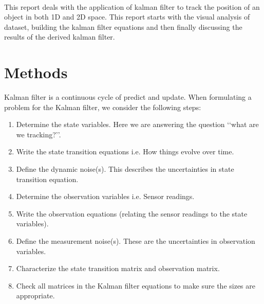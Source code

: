 \documentclass[12pt]{article}
\begin{document}
\\
This report deals with the application of kalman filter to track the position of an object in both 1D and 2D space. This report starts with the visual analysis of dataset, building the kalman filter equations and then finally discussing the results of the derived kalman filter.

\section{Methods}
Kalman filter is a continuous cycle of predict and update. When formulating a problem for the Kalman filter, we consider the following steps: 

\begin{enumerate}
	\item Determine the state variables. Here we are answering the question \lq\lq{}what are we tracking?\rq\rq{}.
	\item Write the state transition equations i.e. How things evolve over time.
	\item Define the dynamic noise(s).  This describes the uncertainties in state transition equation.
	\item Determine the observation variables i.e. Sensor readings.
	\item Write the observation equations (relating the sensor readings to the state variables).
	\item Define the measurement noise(s). These are the uncertainties in observation variables.
	\item Characterize the state transition matrix and observation matrix.
	\item Check all matrices in the Kalman filter equations to make sure the sizes are appropriate.
\end{enumerate} 
\end{document}
